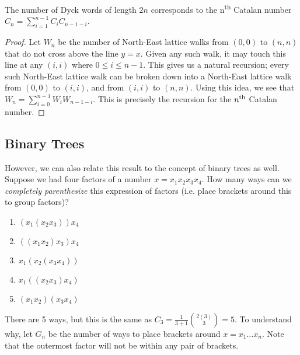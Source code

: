 \begin{theorem}
    The number of Dyck words of length $2n$ corresponds to the n\textsuperscript{th} Catalan number $C_{n}=\sum_{i=1}^{n-1}C_{i}C_{n-1-i}$.
\end{theorem}
\begin{proof}
    Let $W_{n}$ be the number of North-East lattice walks from $(0,0)$ to $(n,n)$ that do not cross above the line $y = x$. Given any such walk, it may touch this line at any $(i, i)$ where $0 \leq i \leq n-1$. This gives us a natural recursion; every such North-East lattice walk can be broken down into a North-East lattice walk from $(0, 0)$ to $(i, i)$, and from $(i, i)$ to $(n, n)$. Using this idea, we see that $W_{n}=\sum_{i=0}^{n-1}W_{i}W_{n-1-i}$. This is precisely the recursion for the $n\textsuperscript{th}$ Catalan number.
\end{proof}

\subsection{Binary Trees}
However, we can also relate this result to the concept of binary trees as well. Suppose we had four factors of a number $x = x_{1}x_{2}x_{3}x_{4}$. How many ways can we \textit{completely parenthesize} this expression of factors (i.e. place brackets around this to group factors)?
\begin{enumerate}
    \item $(x_{1}(x_{2}x_{3}))x_{4}$
    \item $((x_{1}x_{2})x_{3})x_{4}$
    \item $x_{1}(x_{2}(x_{3}x_{4}))$
    \item $x_{1}((x_{2}x_{3})x_{4})$
    \item $(x_{1}x_{2})(x_{3}x_{4})$
\end{enumerate}
There are 5 ways, but this is the same as $C_3 = \frac{1}{3+1} {2(3) \choose 3} = 5$. To understand why, let $G_{n}$ be the number of ways to place brackets around $x = x_{1}\dots x_{n}$. Note that the outermost factor will not be within any pair of brackets.

